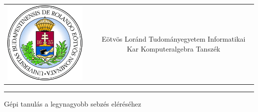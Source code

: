 \documentclass[12pt]{article}
\begin{document}
\begin{titlepage}
	\vspace*{0cm}
	\centering
	\begin{tabular}{cp{1cm}c}
		\begin{minipage}{4cm}
			\vspace{0pt}
			\includegraphics[width=1\textwidth]{elte_cimer}
		\end{minipage} & &
		\begin{minipage}{7cm}
			\vspace{0pt}Eötvös Loránd Tudományegyetem \vspace{10pt} \newline
			Informatikai Kar \vspace{10pt} \newline
			Komputeralgebra Tanszék
		\end{minipage}
	\end{tabular}
	
	\vspace*{0.2cm}
	\rule{\textwidth}{1pt}
	
	\vspace*{4cm}
	{\Huge Gépi tanulás a legynagyobb sebzés eléréséhez }
	
	\vspace*{9cm}
	

\end{titlepage}
\end{document}
